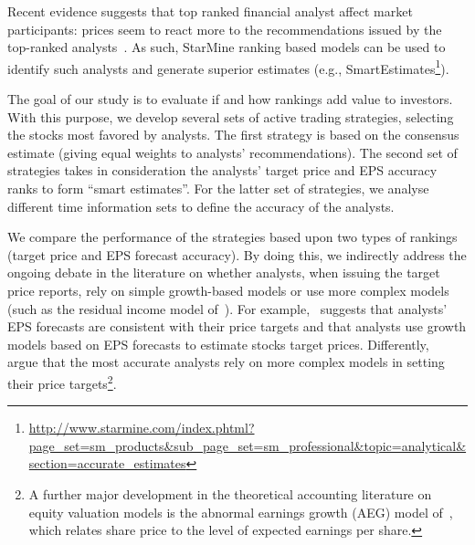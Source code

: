 \documentclass[a4paper,12pt,openright,notitlepage]{report}\usepackage[]{graphicx}\usepackage[]{color}
\begin{document}
Recent evidence suggests that top ranked financial analyst affect market participants: prices seem to react more to the recommendations issued by the top-ranked analysts~\citep{emery2009}. As such, StarMine ranking based models can be used to identify such analysts and generate superior estimates (e.g., SmartEstimates\footnote{\url{http://www.starmine.com/index.phtml?page_set=sm_products&sub_page_set=sm_professional&topic=analytical&section=accurate_estimates}}).



The goal of our study is to evaluate if and how rankings  add value to investors.  With this purpose, we develop several sets of active trading strategies, selecting the stocks most favored by analysts. The first strategy is based on the consensus estimate (giving equal weights to analysts' recommendations). The second set of strategies takes in consideration the analysts' target price and EPS accuracy ranks to form ``smart estimates''. For the latter set of strategies, we analyse different time information sets to define the accuracy of the analysts.


We compare the performance of the strategies based upon two types of rankings (target price and EPS forecast accuracy). By doing this, we indirectly address the ongoing debate in the literature on whether analysts, when issuing the target price reports, rely on simple growth-based models or use more complex models (such as the residual income model of~\cite{ohlson1995}). For example,~\cite{bradshaw2004} suggests that analysts' EPS forecasts are consistent with their price targets and that analysts use growth models based on EPS forecasts to estimate stocks target prices. Differently,~\cite{simon2011} argue that the most accurate analysts rely on more complex models in setting their price targets\footnote{A further major development in the theoretical accounting literature on equity valuation models is the abnormal earnings growth (AEG) model of~\cite{ohlson2005}, which relates share price to the level of expected earnings per share.}.



\end{document}
